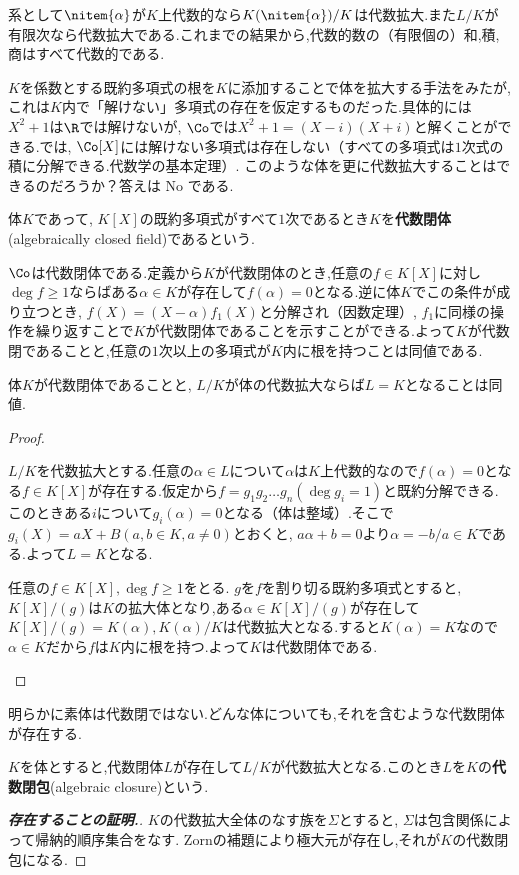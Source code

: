 系として$\nitem{\alpha}$が$K$上代数的なら$K(\nitem{\alpha})/K$は代数拡大.また$L/K$が有限次なら代数拡大である.これまでの結果から,代数的数の（有限個の）和,積,商はすべて代数的である.

$K$を係数とする既約多項式の根を$K$に添加することで体を拡大する手法をみたが,これは$K$内で「解けない」多項式の存在を仮定するものだった.具体的には$X^2+1$は$\R$では解けないが, $\Co$では$X^2+1=(X-i)(X+i)$と解くことができる.では, $\Co[X]$には解けない多項式は存在しない（すべての多項式は$1$次式の積に分解できる.代数学の基本定理）. このような体を更に代数拡大することはできるのだろうか？答えは No である.

\begin{defi}[代数閉体]
	体$K$であって, $K[X]$の既約多項式がすべて$1$次であるとき$K$を\textbf{代数閉体}(algebraically closed field)であるという.
\end{defi}

$\Co$は代数閉体である.定義から$K$が代数閉体のとき,任意の$f\in K[X]$に対し$\deg f\geq1$ならばある$\alpha\in K$が存在して$f(\alpha)=0$となる.逆に体$K$でこの条件が成り立つとき, $f(X)=(X-\alpha)f_1(X)$と分解され（因数定理）,  $f_1$に同様の操作を繰り返すことで$K$が代数閉体であることを示すことができる.よって$K$が代数閉であることと,任意の$1$次以上の多項式が$K$内に根を持つことは同値である.

\begin{prop}
	体$K$が代数閉体であることと, $L/K$が体の代数拡大ならば$L=K$となることは同値.
\end{prop}

\begin{proof}
	\begin{eqv}
		\item $L/K$を代数拡大とする.任意の$\alpha\in L$について$\alpha$は$K$上代数的なので$f(\alpha)=0$となる$f\in K[X]$が存在する.仮定から$f=g_1g_2\dots g_n (\deg g_i=1)$と既約分解できる.このときある$i$について$g_i(\alpha)=0$となる（体は整域）.そこで$g_i(X)=aX+B (a,b\in K, a\neq0)$とおくと, $a\alpha+b=0$より$\alpha=-b/a\in K$である.よって$L=K$となる.
	
	\item 任意の$f\in K[X],\deg f\geq1$をとる. $g$を$f$を割り切る既約多項式とすると, $K[X]/(g)$は$K$の拡大体となり,ある$\alpha\in K[X]/(g)$が存在して$K[X]/(g)=K(\alpha),K(\alpha)/K$は代数拡大となる.すると$K(\alpha)=K$なので$\alpha\in K$だから$f$は$K$内に根を持つ.よって$K$は代数閉体である.
	\end{eqv}
\end{proof}

明らかに素体は代数閉ではない.どんな体についても,それを含むような代数閉体が存在する.

\begin{defi}[代数閉包]
	$K$を体とすると,代数閉体$L$が存在して$L/K$が代数拡大となる.このとき$L$を$K$の\textbf{代数閉包}(algebraic closure)という.
\end{defi}

\begin{proof}[\textbf{存在することの証明.}]
	$K$の代数拡大全体のなす族を$\Sigma$とすると, $\Sigma$は包含関係によって帰納的順序集合をなす. Zornの補題により極大元が存在し,それが$K$の代数閉包になる.
\end{proof}